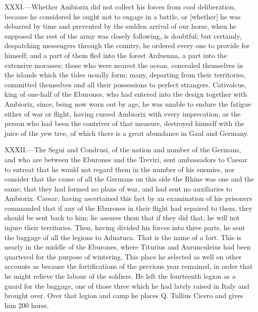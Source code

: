 XXXI.—Whether Ambiorix did not collect his forces from cool
deliberation, because he considered he ought not to engage in a battle,
or [whether] he was debarred by time and prevented by the sudden arrival
of our horse, when he supposed the rest of the army was closely
following, is doubtful; but certainly, despatching messengers through
the country, he ordered every one to provide for himself; and a part of
them fled into the forest Arduenna, a part into the extensive morasses;
those who were nearest the ocean, concealed themselves in the islands
which the tides usually form; many, departing from their territories,
committed themselves and all their possessions to perfect strangers.
Cativolcus, king of one-half of the Eburones, who had entered into the
design together with Ambiorix, since, being now worn out by age, he was
unable to endure the fatigue either of war or flight, having cursed
Ambiorix with every imprecation, as the person who had been the
contriver of that measure, destroyed himself with the juice of the yew
tree, of which there is a great abundance in Gaul and Germany.

XXXII.—The Segui and Condrusi, of the nation and number of the Germans,
and who are between the Eburones and the Treviri, sent ambassadors to
Caesar to entreat that he would not regard them in the number of his
enemies, nor consider that the cause of all the Germans on this side the
Rhine was one and the same; that they had formed no plans of war, and
had sent no auxiliaries to Ambiorix. Caesar, having ascertained this
fact by an examination of his prisoners commanded that if any of the
Eburones in their flight had repaired to them, they should be sent back
to him; he assures them that if they did that, he will not injure their
territories. Then, having divided his forces into three parts, he sent
the baggage of all the legions to Aduatuca. That is the name of a fort.
This is nearly in the middle of the Eburones, where Titurius and
Aurunculeius had been quartered for the purpose of wintering. This place
he selected as well on other accounts as because the fortifications of
the previous year remained, in order that he might relieve the labour of
the soldiers. He left the fourteenth legion as a guard for the baggage,
one of those three which he had lately raised in Italy and brought over.
Over that legion and camp he places Q. Tullius Cicero and gives him 200
horse.

